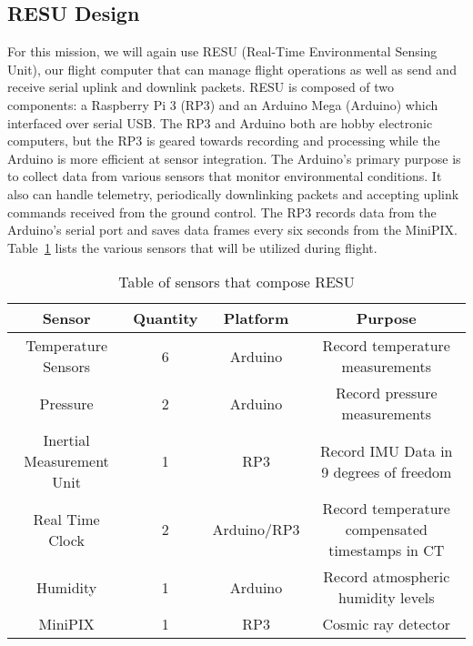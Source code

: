 \subsection{RESU Design}
\label{sec:RESU-Design}

For this mission, we will again use RESU (Real-Time Environmental Sensing Unit), our flight computer that can manage flight operations as well as send and receive serial uplink and downlink packets. RESU is composed of two components: a Raspberry Pi 3 (RP3) and an Arduino Mega (Arduino) which interfaced over serial USB.  The RP3 and Arduino both are hobby electronic computers, but the RP3 is geared towards recording and processing while the Arduino is more efficient at sensor integration.  The Arduino's primary purpose is to collect data from various sensors that monitor environmental conditions. It also can handle telemetry, periodically downlinking packets and accepting uplink commands received from the ground control. The RP3 records data from the Arduino's serial port and saves data frames every six seconds from the MiniPIX.  Table~\ref{tab:Sensors} lists the various sensors that will be utilized during flight.

\begin{table}[h!]
\centering
\caption{Table of sensors that compose RESU}
\label{tab:Sensors}
\bigskip
\begin{tabular}{|c|c|c|c|}
\hline
\multicolumn{1}{|c|}{\bfseries Sensor} & {\bfseries Quantity} & {\bfseries Platform} & {\bfseries Purpose} \\
\hline
    Temperature Sensors         	& 6 & Arduino  		& Record temperature measurements  \\ \hline
    Pressure        				& 2 & Arduino 		& Record pressure measurements \\ \hline
    Inertial Measurement Unit       & 1 & RP3    		& Record IMU Data in 9 degrees of freedom \\ \hline    
    Real Time Clock 				& 2 & Arduino/RP3 	& Record temperature compensated timestamps in CT \\\hline
    Humidity        				& 1 & Arduino 		& Record atmospheric humidity levels \\ \hline
    MiniPIX         				& 1 & RP3     		& Cosmic ray detector \\ \hline
\end{tabular}
\end{table}

